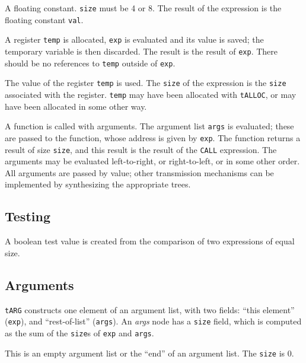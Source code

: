 \begin{production}
A floating constant. \verb|size| must be 4 or 8.
The result of the expression is the floating constant \verb|val|.


A register \verb|temp| is allocated, \verb|exp| is evaluated
and its value is saved; the temporary variable is then discarded.
The result is the result of \verb|exp|.
There should be no references to \verb|temp| outside of \verb|exp|.


The value of the register \verb|temp| is used.
The \verb|size| of the expression
is the \verb|size| associated with the register.
\verb|temp| may have been allocated with \verb|tALLOC|,
or may have been allocated in some other way.


A function is called with arguments.
The argument list \verb|args| is evaluated;
these are passed to the function, whose address is given by \verb|exp|.
The function returns a result of size \verb|size|, and this result is the result
of the \verb|CALL| expression.
The arguments may be evaluated left-to-right, or right-to-left, or in some
other order. All arguments are passed by value; other transmission mechanisms
can be implemented by synthesizing the appropriate trees.
\end{production}

\subsection{Testing}

\begin{production}

A boolean test value is created from the comparison of two expressions
of equal size.
\end{production}

\subsection{Arguments}

\begin{production}

\verb|tARG| constructs one element of an argument list, with two fields:
``this element'' (\verb|exp|), and ``rest-of-list'' (\verb|args|).
An {\it args\/} node has a \verb|size| field, which
is computed as the sum of the \verb|size|s of \verb|exp| and \verb|args|.


This is an empty argument list or the ``end'' of an argument list.
The \verb|size| is 0.
\end{production}

